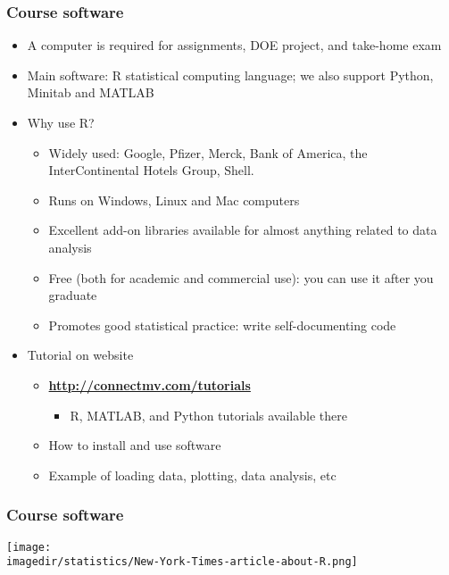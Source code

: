 \begin{frame}\frametitle{Course software}
	\begin{itemize}
		\item	A computer is required for assignments, DOE project, and take-home exam 
		\item	Main software: R statistical computing language; we also support Python, Minitab and MATLAB 
	\end{itemize}
	\begin{itemize}
		\item	Why use R? 
		\begin{itemize}
			\item	Widely used: Google, Pfizer, Merck, Bank of America, the InterContinental Hotels Group, Shell. 
			\item	Runs on Windows, Linux and Mac computers 
			\item	Excellent add-on libraries available for almost anything related to data analysis 
			\item	Free (both for academic and commercial use): you can use it after you graduate 
			\item	Promotes good statistical practice: write self-documenting code 
		\end{itemize}
	\end{itemize}
	\begin{itemize}
		\item	Tutorial on website 
		\begin{itemize}
			\item	\textbf{\href{http://connectmv.com/tutorials}{http://connectmv.com/tutorials}} 
			\begin{itemize}
				\item	R, MATLAB, and Python tutorials available there 
			\end{itemize}
			\item	How to install and use software 
			\item	Example of loading data, plotting, data analysis, etc 
		\end{itemize}
	\end{itemize}
\end{frame}

\begin{frame}\frametitle{Course software}
	
	\texttt{[image: \\imagedir/statistics/New-York-Times-article-about-R.png]}
\end{frame}

